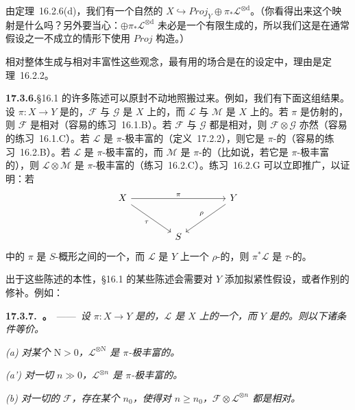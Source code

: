 由\mbox{定理~16.2.6}(d)，我们有一个自然的\trOpenEmbedding{} $X\hookrightarrow\mathit{Proj}_Y\oplus\pi_*\mathscr{L}^{\otimes\mathrm{d}}$。（你看得出来这个映射是什么吗？另外要当心：$\oplus\pi_*\mathscr{L}^{\otimes\mathrm{d}}$ 未必是一个有限生成的\trSheafOfGradedAlgebras，所以我们这是在通常假设之一不成立的情形下使用 $\mathit{Proj}$ 构造。）

相对整体生成与相对丰富性这些观念，最有用的场合是在\trProper{}的设定中，理由是\mbox{定理~16.2.2}。

\textbf{17.3.6.}\quad \S16.1 的许多陈述可以原封不动地照搬过来。例如，我们有下面这组结果。设 $\pi\colon X\to Y$ 是\trProper{}的，$\mathscr{F}$ 与 $\mathscr{G}$ 是 $X$ 上的\trQCSheaf，而 $\mathscr{L}$ 与 $\mathscr{M}$ 是 $X$ 上的\trInvertibleSheaf。若 $\pi$ 是仿射的，则 $\mathscr{F}$ 是相对\trGloballyGenerated（容易的\mbox{练习~16.1.B}）。若 $\mathscr{F}$ 与 $\mathscr{G}$ 都是相对\trGloballyGenerated，则 $\mathscr{F}\otimes\mathscr{G}$ 亦然（容易的\mbox{练习~16.1.C}）。若 $\mathscr{L}$ 是 $\pi$-极丰富的（\mbox{定义~17.2.2}），则它是 $\pi$-\trBasePointFree{}的（容易的\mbox{练习~16.2.B}）。若 $\mathscr{L}$ 是 $\pi$-极丰富的，而 $\mathscr{M}$ 是 $\pi$-\trBasePointFree{}的（比如说，若它是 $\pi$-极丰富的），则 $\mathscr{L}\otimes\mathscr{M}$ 是 $\pi$-极丰富的（\mbox{练习~16.2.C}）。\mbox{练习~16.2.G} 可以立即推广，以证明：若
\[
\begin{tikzcd}[row sep=2.6em, column sep=4.2em]
X \ar[rr, "\pi"] \ar[dr, "\tau"'] && Y \ar[dl, "\rho"'] \\
& S &
\end{tikzcd}
\]
中的 $\pi$ 是 $S$-概形之间的一个\trFinite\trMorphism，而 $\mathscr{L}$ 是 $Y$ 上一个 $\rho$-\trAmple{}的\trInvertibleSheaf，则 $\pi^*\mathscr{L}$ 是 $\tau$-\trAmple{}的。

出于这些陈述的本性，\S16.1 的某些陈述会需要对 $Y$ 添加拟紧性假设，或者作别的修补。例如：

\textbf{17.3.7.\ \trhTheorem{}。}\ ——\ \emph{设 $\pi\colon X\to Y$ 是\trProper{}的，$\mathscr{L}$ 是 $X$ 上的一个\trInvertibleSheaf，而 $Y$ 是\trQuasicompact{}的。则以下诸条件等价。}

\emph{(a) 对某个 $\mathrm{N}>0$，$\mathscr{L}^{\otimes\mathrm{N}}$ 是 $\pi$-极丰富的。}

\emph{(a') 对一切 $n\gg 0$，$\mathscr{L}^{\otimes n}$ 是 $\pi$-极丰富的。}

\emph{(b) 对一切\trFiniteType{}的\trQCSheaf{} $\mathscr{F}$，存在某个 $n_0$，使得对 $n\ge n_0$，$\mathscr{F}\otimes\mathscr{L}^{\otimes n}$ 都是相对\trGloballyGenerated。}

